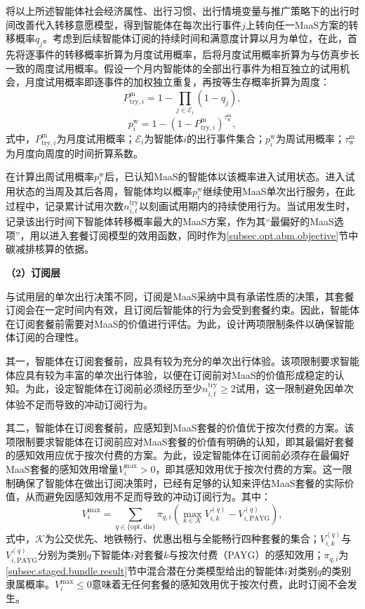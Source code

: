将以上所述智能体社会经济属性、出行习惯、出行情境变量与推广策略下的出行时间改善代入转移意愿模型，得到智能体在每次出行事件$j$上转向任一MaaS方案的转移概率$q_{j}$。考虑到后续智能体订阅的持续时间和满意度计算以月为单位，在此，首先将逐事件的转移概率折算为月度试用概率，后将月度试用概率折算为与仿真步长一致的周度试用概率。假设一个月内智能体的全部出行事件为相互独立的试用机会，月度试用概率即逐事件的加权独立重复，再按等生存概率折算为周度：
\begin{equation}
P_{\mathrm{try},i}^{\mathrm{m}} = 1-\prod_{j\in\mathcal{E}_{i}}\left(1-q_{j}\right),
\label{eq.opt.trymonth}
\end{equation}
\begin{equation}
p_{i}^{\mathrm{w}} = 1-\left(1-P_{\mathrm{try},i}^{\mathrm{m}}\right)^{\tau^{\mathrm{m}} _{\mathrm{w}}},
\label{eq.opt.tryweek}
\end{equation}
式中，$P_{\mathrm{try},i}^{\mathrm{m}}$为月度试用概率；$\mathcal{E}_{i}$为智能体$i$的出行事件集合；$p_{i}^{\mathrm{w}}$为周试用概率；$\tau^{\mathrm{m}} _{\mathrm{w}}$为月度向周度的时间折算系数。

在计算出周试用概率$p_{i}^{\mathrm{w}}$后，已认知MaaS的智能体以该概率进入试用状态。进入试用状态的当周及其后各周，智能体均以概率$p_{i}^{\mathrm{w}}$继续使用MaaS单次出行服务，在此过程中，记录累计试用次数$n_{i,t}^{\mathrm{try}}$以刻画试用期内的持续使用行为。当试用发生时，记录该出行时间下智能体转移概率最大的MaaS方案，作为其``最偏好的MaaS选项''，用以进入套餐订阅模型的效用函数，同时作为\ref{subsec.opt.abm.objective}节中碳减排核算的依据。

\textbf{（2）订阅层}

与试用层的单次出行决策不同，订阅是MaaS采纳中具有承诺性质的决策，其套餐订阅会在一定时间内有效，且订阅后智能体的行为会受到套餐约束。因此，智能体在订阅套餐前需要对MaaS的价值进行评估。为此，设计两项限制条件以确保智能体订阅的合理性。

其一，智能体在订阅套餐前，应具有较为充分的单次出行体验。该项限制要求智能体应具有较为丰富的单次出行体验，以便在订阅前对MaaS的价值形成稳定的认知。为此，设定智能体在订阅前必须经历至少$n_{i,t}^{\mathrm{try}}\geq 2$试用，这一限制避免因单次体验不足而导致的冲动订阅行为。

其二，智能体在订阅套餐前，应感知到MaaS套餐的价值优于按次付费的方案。该项限制要求智能体在订阅前应对MaaS套餐的价值有明确的认知，即其最偏好套餐的感知效用应优于按次付费的方案。为此，设定智能体在订阅前必须存在最偏好MaaS套餐的感知效用增量$V_{i}^{\max}>0$，即其感知效用优于按次付费的方案。这一限制确保了智能体在做出订阅决策时，已经有足够的认知来评估MaaS套餐的实际价值，从而避免因感知效用不足而导致的冲动订阅行为。其中：
\begin{equation}
V_{i}^{\max} = \sum_{q\in\{\mathrm{opt},\mathrm{dis}\}}\pi_{q,i}\left(\max_{k\in\mathcal{K}} V_{i,k}^{(q)}-V_{i,\mathrm{PAYG}}^{(q)}\right),
\label{eq.opt.maxav}
\end{equation}
式中，$\mathcal{K}$为公交优先、地铁畅行、优惠出租与全能畅行四种套餐的集合；$V_{i,k}^{(q)}$与$V_{i,\mathrm{PAYG}}^{(q)}$分别为类别$q$下智能体$i$对套餐$k$与按次付费（PAYG）的感知效用；$\pi_{q,i}$为\ref{subsec.staged.bundle.result}节中混合潜在分类模型给出的智能体$i$对类别$q$的类别隶属概率。$V_{i}^{\max}\leq 0$意味着无任何套餐的感知效用优于按次付费，此时订阅不会发生。

